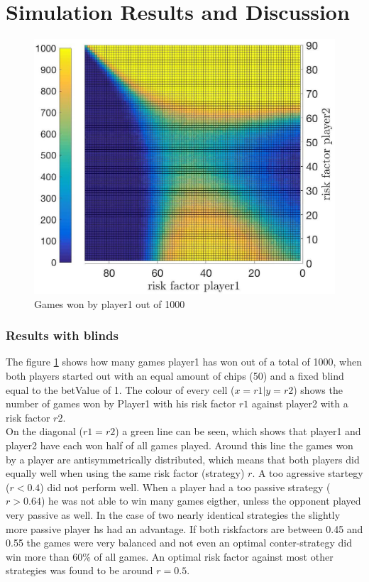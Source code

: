 \documentclass[11pt]{article}
\begin{document}
\section{Simulation Results and Discussion}
\begin{figure}
\begin{center}


\includegraphics[scale=0.2]{Graphics/allDataPlot_BlindOn_1000Games_001Step_TopFlat.jpg}
\caption{Games won by player1 out of 1000\label{Topview of all Data}}
\end{center}
\end{figure}

\subsubsection{Results with blinds}
The figure \ref{Topview of all Data} shows how many games player1 has won out of a total of 1000, when both players started out with an equal amount of chips (50) and a fixed blind equal to the betValue of 1. The colour of every cell ($x=r1|y=r2$) shows the number of games won by Player1 with his risk factor $r1$ against player2 with a risk factor $r2$.\\
On the diagonal ($r1=r2$) a green line can be seen, which shows that player1 and player2 have each won half of all games played. Around this line the games won by a player are antisymmetrically distributed, which means that both players did equally well when using the same risk factor (strategy) $r$.
A too agressive startegy ($r < 0.4$) did not perform well. When a player had a too passive strategy ($r > 0.64$) he was not able to win many games eigther, unless the opponent played very passive as well. In the case of two nearly identical strategies the slightly more passive player hs had an advantage.
If both riskfactors are between 0.45 and 0.55 the games were very balanced and not even an optimal conter-strategy did win more than 60\% of all games. An optimal risk factor against most other strategies was found to be around $r=0.5$. \\
\end{document}
